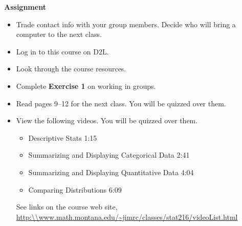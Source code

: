 {\bf Assignment}\\
\begin{itemize}
\item  Trade contact info with your group members.  Decide who will
  bring a computer to the next class.
\item   Log in to this course on D2L.
\item   Look through the course resources.
\item  Complete {\bf Exercise 1} on working in groups.
\item Read pages 9--12 for the next class. You will be quizzed over them.
\item View the following videos. You will be quizzed over them.
  \begin{itemize}
  \item Descriptive Stats 1:15
  \item Summarizing and Displaying Categorical Data 2:41
  \item Summarizing and Displaying Quantitative Data 4:04
  \item Comparing Distributions 6:09
  \end{itemize}
  See links on the course web site, \url{http:\\www.math.montana.edu/~jimrc/classes/stat216/videoList.html}
\end{itemize}




  


